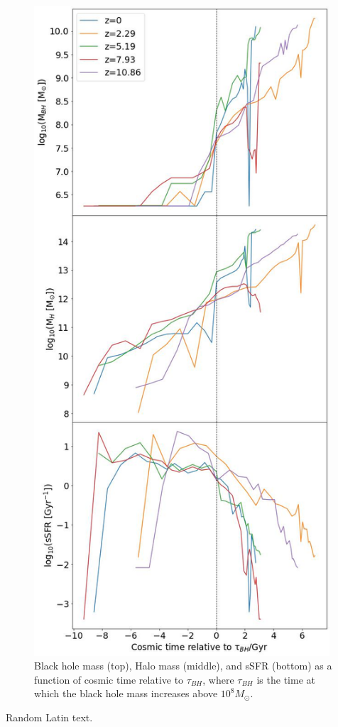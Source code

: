 \documentclass[12pt, twocolumn]{revtex4}    %
\begin{document}
\begin{figure}[H]
\centering
\includegraphics[width=11cm]{Plot_4.jpeg}
\caption{Black hole mass (top), Halo mass (middle), and sSFR (bottom) as a function of cosmic time relative to $\tau_{BH}$, where $\tau_{BH}$ is the time at which the black hole mass increases above $10^8M_\odot$.}
\label{fig:4}
\end{figure}
\twocolumngrid


Random Latin text.
\end{document}
